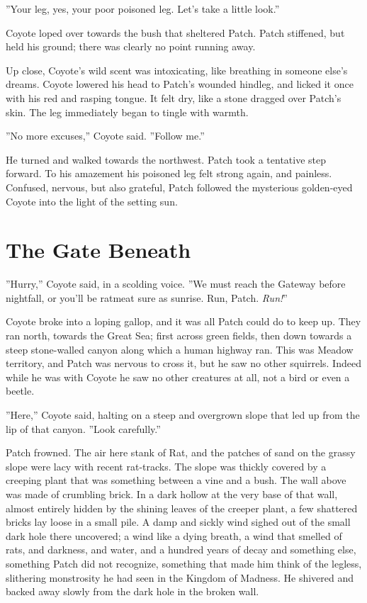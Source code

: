 \documentclass[12pt]{book}
\begin{document}
''Your leg, yes, your poor poisoned leg. Let's take a little look.''

Coyote loped over towards the bush that sheltered Patch. Patch stiffened, but held his ground; there was clearly no point running away.

Up close, Coyote's wild scent was intoxicating, like breathing in someone else's dreams. Coyote lowered his head to Patch's wounded hindleg, and licked it once with his red and rasping tongue. It felt dry, like a stone dragged over Patch's skin. The leg immediately began to tingle with warmth.

''No more excuses,'' Coyote said. ''Follow me.''

He turned and walked towards the northwest. Patch took a tentative step forward. To his amazement his poisoned leg felt strong again, and painless. Confused, nervous, but also grateful, Patch followed the mysterious golden-eyed Coyote into the light of the setting sun.


\section{The Gate Beneath}

''Hurry,'' Coyote said, in a scolding voice. ''We must reach the Gateway before nightfall, or you'll be ratmeat sure as sunrise. Run, Patch. {\it Run!}''

Coyote broke into a loping gallop, and it was all Patch could do to keep up. They ran north, towards the Great Sea; first across green fields, then down towards a steep stone-walled canyon along which a human highway ran. This was Meadow territory, and Patch was nervous to cross it, but he saw no other squirrels. Indeed while he was with Coyote he saw no other creatures at all, not a bird or even a beetle.

''Here,'' Coyote said, halting on a steep and overgrown slope that led up from the lip of that canyon. ''Look carefully.''

Patch frowned. The air here stank of Rat, and the patches of sand on the grassy slope were lacy with recent rat-tracks. The slope was thickly covered by a creeping plant that was something between a vine and a bush. The wall above was made of crumbling brick. In a dark hollow at the very base of that wall, almost entirely hidden by the shining leaves of the creeper plant, a few shattered bricks lay loose in a small pile. A damp and sickly wind sighed out of the small dark hole there uncovered; a wind like a dying breath, a wind that smelled of rats, and darkness, and water, and a hundred years of decay %
and something else, something Patch did not recognize, something that made him think of the legless, slithering monstrosity he had seen in the Kingdom of Madness. He shivered and backed away slowly from the dark hole in the broken wall.
\end{document}
